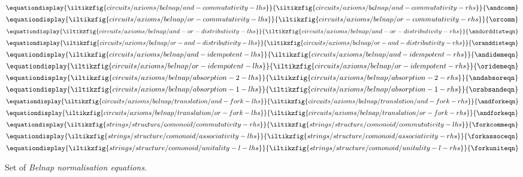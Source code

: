 \documentclass[10pt]{article}
\begin{document}
\begin{figure}[p]
{    }{
    }{\orassoc}\)
    \quad
    \(\equationdisplay{
        \iltikzfig{circuits/axioms/belnap/and-commutativity-lhs}
    }{
        \iltikzfig{circuits/axioms/belnap/and-commutativity-rhs}
    }{\andcomm}\)
    \quad
    \(\equationdisplay{
        \iltikzfig{circuits/axioms/belnap/or-commutativity-lhs}
    }{
        \iltikzfig{circuits/axioms/belnap/or-commutativity-rhs}
    }{\orcomm}\)
    \\[1em]
    \(\equationdisplay{
        \iltikzfig{circuits/axioms/belnap/and-or-distributivity-lhs}
    }{
        \iltikzfig{circuits/axioms/belnap/and-or-distributivity-rhs}
    }{\andorddisteqn}\)
    \quad
    \(\equationdisplay{
        \iltikzfig{circuits/axioms/belnap/or-and-distributivity-lhs}
    }{
        \iltikzfig{circuits/axioms/belnap/or-and-distributivity-rhs}
    }{\oranddisteqn}\)
    \quad
    \(\equationdisplay{
        \iltikzfig{circuits/axioms/belnap/and-idempotent-lhs}
    }{
        \iltikzfig{circuits/axioms/belnap/and-idempotent-rhs}
    }{\andidemeqn}\)
    \quad
    \(\equationdisplay{
        \iltikzfig{circuits/axioms/belnap/or-idempotent-lhs}
    }{
        \iltikzfig{circuits/axioms/belnap/or-idempotent-rhs}
    }{\oridemeqn}\)
    \\[1em]
    \(\equationdisplay{
        \iltikzfig{circuits/axioms/belnap/absorption-2-lhs}
    }{
        \iltikzfig{circuits/axioms/belnap/absorption-2-rhs}
    }{\andabsoreqn}\)
    \quad
    \(\equationdisplay{
        \iltikzfig{circuits/axioms/belnap/absorption-1-lhs}
    }{
        \iltikzfig{circuits/axioms/belnap/absorption-1-rhs}
    }{\orabsandeqn}\)
    \(\equationdisplay{
        \iltikzfig{circuits/axioms/belnap/translation/and-fork-lhs}
    }{
        \iltikzfig{circuits/axioms/belnap/translation/and-fork-rhs}
    }{\andforkeqn}\)
    \quad
    \(\equationdisplay{
        \iltikzfig{circuits/axioms/belnap/translation/or-fork-lhs}
    }{
        \iltikzfig{circuits/axioms/belnap/translation/or-fork-rhs}
    }{\andforkeqn}\)
    \\[1em]
    \(\equationdisplay{
        \iltikzfig{strings/structure/comonoid/commutativity-rhs}
    }{
        \iltikzfig{strings/structure/comonoid/commutativity-lhs}
    }{\forkcommeqn}\)
    \quad
    \(\equationdisplay{
        \iltikzfig{strings/structure/comonoid/associativity-lhs}
    }{
        \iltikzfig{strings/structure/comonoid/associativity-rhs}
    }{\forkassoceqn}\)
    \quad
    \(\equationdisplay{
        \iltikzfig{strings/structure/comonoid/unitality-l-lhs}
    }{
        \iltikzfig{strings/structure/comonoid/unitality-l-rhs}
    }{\forkuniteqn}\)
    \caption{
        Set of \emph{Belnap normalisation equations}.
    }
    \label{fig:normal-form-equations}
\end{figure}
\end{document}

